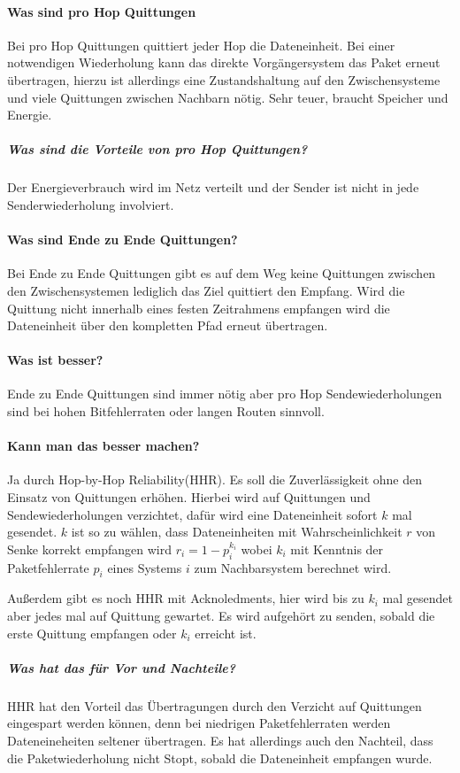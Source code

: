 	\paragraph{Was sind pro Hop Quittungen}
	 Bei pro Hop Quittungen quittiert jeder Hop die Dateneinheit. Bei einer notwendigen Wiederholung kann das direkte Vorgängersystem das Paket erneut übertragen, hierzu ist allerdings eine Zustandshaltung auf den Zwischensysteme und viele Quittungen zwischen Nachbarn nötig. Sehr teuer, braucht Speicher und Energie.
	 \subparagraph{Was sind die Vorteile von pro Hop Quittungen?}
	 Der Energieverbrauch wird im Netz verteilt und der Sender ist nicht in jede Senderwiederholung involviert.
	 
	 \paragraph{Was sind Ende zu Ende Quittungen?}
	 Bei Ende zu Ende Quittungen gibt es auf dem Weg keine Quittungen zwischen den Zwischensystemen lediglich das Ziel quittiert den Empfang. Wird die Quittung nicht innerhalb eines festen Zeitrahmens empfangen wird die Dateneinheit über den kompletten Pfad erneut übertragen.
	 
	 \paragraph{Was ist besser?}
	 Ende zu Ende Quittungen sind immer nötig aber pro Hop Sendewiederholungen sind bei hohen Bitfehlerraten oder langen Routen sinnvoll.
	 
	 \paragraph{Kann man das besser machen?}
	 Ja durch Hop-by-Hop Reliability(HHR). Es soll die Zuverlässigkeit ohne den Einsatz von Quittungen erhöhen.
	 Hierbei wird auf Quittungen und Sendewiederholungen verzichtet, dafür wird eine Dateneinheit sofort $k$ mal gesendet. $k$ ist so zu wählen, dass Dateneinheiten mit Wahrscheinlichkeit $r$ von Senke korrekt empfangen wird $r_i=1-p_i^{k_i}$ wobei $k_i$ mit Kenntnis der Paketfehlerrate $p_i$ eines Systems $i$ zum Nachbarsystem berechnet wird.
	 
	Außerdem gibt es noch HHR mit Acknoledments, hier wird bis zu $k_i$ mal gesendet aber jedes mal auf Quittung gewartet. Es wird aufgehört zu senden, sobald die erste Quittung empfangen oder $k_i$ erreicht ist.
	
	\subparagraph{Was hat das für Vor und Nachteile?}
	HHR hat den Vorteil das Übertragungen durch den Verzicht auf Quittungen eingespart werden können, denn bei niedrigen Paketfehlerraten werden Dateneineheiten seltener übertragen. Es hat allerdings auch den Nachteil, dass die Paketwiederholung nicht Stopt, sobald die Dateneinheit empfangen wurde.
	
